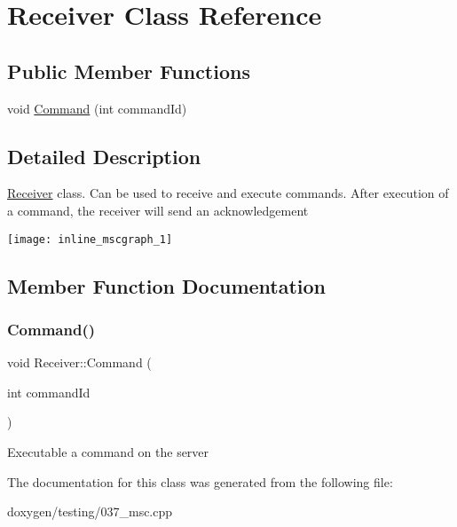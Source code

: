 \hypertarget{class_receiver}{}\section{Receiver Class Reference}
\label{class_receiver}
\subsection*{Public Member Functions}
\begin{DoxyCompactItemize}
\item 
void \mbox{\hyperlink{class_receiver_a162099741e0324e6254c9bc570566e40}{Command}} (int command\+Id)
\end{DoxyCompactItemize}


\subsection{Detailed Description}
\mbox{\hyperlink{class_receiver}{Receiver}} class. Can be used to receive and execute commands. After execution of a command, the receiver will send an acknowledgement 
\begin{DoxyImageNoCaption}
  \mbox{\texttt{[image: inline\_mscgraph\_1]}}
\end{DoxyImageNoCaption}
 

\subsection{Member Function Documentation}
\mbox{\label{class_receiver_a162099741e0324e6254c9bc570566e40}} 
\subsubsection{\texorpdfstring{Command()}{Command()}}
{\footnotesize\ttfamily void Receiver\+::\+Command (\begin{DoxyParamCaption}\item[{int}]{command\+Id }\end{DoxyParamCaption})}

Executable a command on the server 

The documentation for this class was generated from the following file\+:\begin{DoxyCompactItemize}
\item 
doxygen/testing/037\+\_\+msc.\+cpp\end{DoxyCompactItemize}
